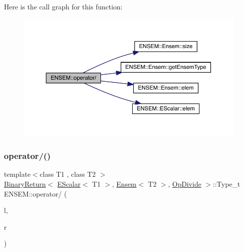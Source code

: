 Here is the call graph for this function\+:\nopagebreak
\begin{figure}[H]
\begin{center}
\leavevmode
\includegraphics[width=350pt]{d1/d9e/group__eensem_ga77b1f275ee5f8d89819ec03dab4ff756_cgraph}
\end{center}
\end{figure}
\mbox{\label{group__eensem_ga6a5de93e7f9569ae6390f831343a0430}} 
\subsubsection{\texorpdfstring{operator/()}{operator/()}\hspace{0.1cm}{\footnotesize\ttfamily [3/3]}}
{\footnotesize\ttfamily template$<$class T1 , class T2 $>$ \\
\mbox{\hyperlink{structENSEM_1_1BinaryReturn}{Binary\+Return}}$<$ \mbox{\hyperlink{classENSEM_1_1EScalar}{E\+Scalar}}$<$ T1 $>$, \mbox{\hyperlink{classENSEM_1_1Ensem}{Ensem}}$<$ T2 $>$, \mbox{\hyperlink{structENSEM_1_1OpDivide}{Op\+Divide}} $>$\+::Type\+\_\+t E\+N\+S\+E\+M\+::operator/ (\begin{DoxyParamCaption}\item[{const \mbox{\hyperlink{classENSEM_1_1EScalar}{E\+Scalar}}$<$ T1 $>$ \&}]{l,  }\item[{const \mbox{\hyperlink{classENSEM_1_1Ensem}{Ensem}}$<$ T2 $>$ \&}]{r }\end{DoxyParamCaption})\hspace{0.3cm}{\ttfamily [inline]}}

